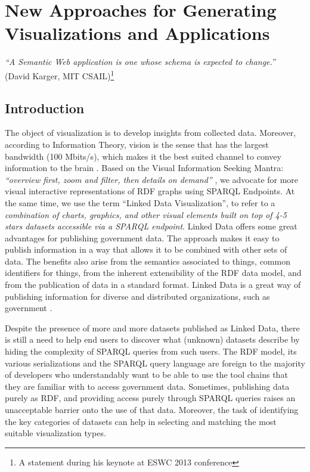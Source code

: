\chapter{New Approaches for Generating Visualizations and Applications}
\label{ch:ch5}

\begin{flushright}
\textit{``A Semantic Web application is one whose schema is expected to change.''} \\ (David Karger, MIT CSAIL)\footnote{A statement during his keynote at ESWC 2013 conference}
\end{flushright}


\section{Introduction}
\label{sec:introch5}
The object of visualization is to develop insights from collected data. Moreover, according to Information Theory, vision is the sense that has the largest bandwidth (100 Mbits/s), which makes it the best suited channel to convey information to the brain \cite{Ware:2014}. Based on the Visual Information Seeking Mantra: \textit{``overview first, zoom and filter, then details on demand''} \cite{Shneiderman99}, we advocate for more visual interactive representations of RDF graphs using SPARQL Endpoints.   At the same time,  we use the term ``Linked Data Visualization'', to refer to a \textit{combination of charts, graphics, and other visual elements built on top of 4-5 stars datasets accessible via a SPARQL endpoint}. 
Linked Data offers some great advantages for publishing government data. The approach makes it easy to publish information in a way that allows it to be combined with other sets of data. The benefits also arise from the semantics associated to things, common identifiers for things, from the inherent extensibility of the RDF data model, and from the publication of data in a standard format. Linked Data is a great way of publishing information for diverse and distributed organizations, such as government \cite{tennison10}.

Despite the presence of more and more datasets published as Linked Data, there is still a need to help end users to discover what (unknown) datasets describe by hiding the complexity of SPARQL queries from such users. The RDF model, its various serializations and the SPARQL query language are foreign to the majority of developers who understandably want to be able to use the tool chains that they are familiar with to access government data. Sometimes, publishing data purely as RDF, and providing access purely through SPARQL queries raises an unacceptable barrier onto the use of that data. Moreover, the task of identifying the key categories of datasets can help in selecting and matching the most suitable visualization types.

